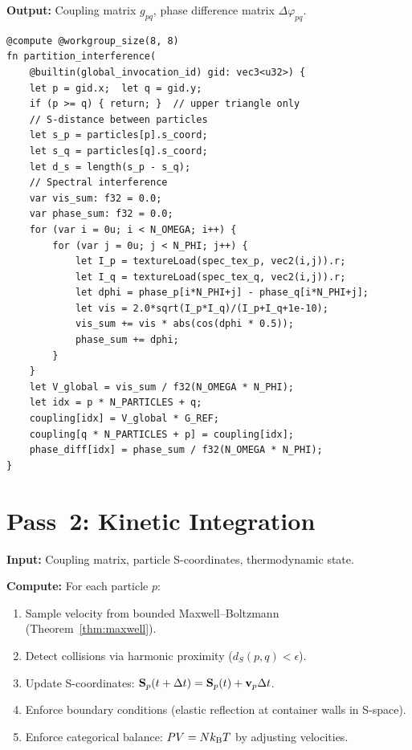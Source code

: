 \textbf{Output:} Coupling matrix $g_{pq}$, phase difference matrix $\Delta\varphi_{pq}$.

\begin{lstlisting}[style=wgsl,caption={Pass 1: Partition Interference (WGSL pseudocode)}]
@compute @workgroup_size(8, 8)
fn partition_interference(
    @builtin(global_invocation_id) gid: vec3<u32>) {
    let p = gid.x;  let q = gid.y;
    if (p >= q) { return; }  // upper triangle only
    // S-distance between particles
    let s_p = particles[p].s_coord;
    let s_q = particles[q].s_coord;
    let d_s = length(s_p - s_q);
    // Spectral interference
    var vis_sum: f32 = 0.0;
    var phase_sum: f32 = 0.0;
    for (var i = 0u; i < N_OMEGA; i++) {
        for (var j = 0u; j < N_PHI; j++) {
            let I_p = textureLoad(spec_tex_p, vec2(i,j)).r;
            let I_q = textureLoad(spec_tex_q, vec2(i,j)).r;
            let dphi = phase_p[i*N_PHI+j] - phase_q[i*N_PHI+j];
            let vis = 2.0*sqrt(I_p*I_q)/(I_p+I_q+1e-10);
            vis_sum += vis * abs(cos(dphi * 0.5));
            phase_sum += dphi;
        }
    }
    let V_global = vis_sum / f32(N_OMEGA * N_PHI);
    let idx = p * N_PARTICLES + q;
    coupling[idx] = V_global * G_REF;
    coupling[q * N_PARTICLES + p] = coupling[idx];
    phase_diff[idx] = phase_sum / f32(N_OMEGA * N_PHI);
}
\end{lstlisting}

\section{Pass~2: Kinetic Integration}
\label{sec:pass2}

\textbf{Input:} Coupling matrix, particle S-coordinates, thermodynamic state.

\textbf{Compute:} For each particle $p$:
\begin{enumerate}
    \item Sample velocity from bounded Maxwell--Boltzmann (Theorem~\ref{thm:maxwell}).
    \item Detect collisions via harmonic proximity ($d_S(p, q) < \epsilon$).
    \item Update S-coordinates: $\mathbf{S}_p(t + \Delta t) = \mathbf{S}_p(t) + \mathbf{v}_p \Delta t$.
    \item Enforce boundary conditions (elastic reflection at container walls in S-space).
    \item Enforce categorical balance: $PV = Nk_{\mathrm{B}} T$ by adjusting velocities.
\end{enumerate}

